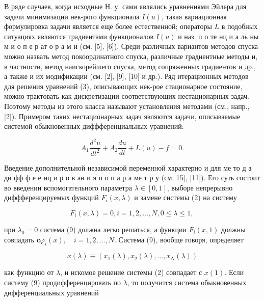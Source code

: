 \documentclass[10pt]{article}
\begin{document}
В ряде случаев, когда исходные Н. у. сами являлись уравнениями Эйлера для задачи минимизации нек-рого функционала $I(u)$, такая вариационная формулировка задачи является еще более естественной; операторы $L$ в подобных ситуациях являются градиентами функционалов $I(u)$ и наз. п о те нц и а ль ны м и о п е р ат о р а м и (см. [5], [6]). Среди различных вариантов методов спуска можно назвать метод покоординатного спуска, различные градиентные методы и, в частности, метод наискорейшего спуска, метод сопряженных градиентов и др., а также и их модификации (см. [2], [9], [10] и др.). Ряд итерационных методов для решения уравнений (3), описывающих нек-рое стационарное состояние, можно трактовать как дискретизации соответствующих нестационарных задач. Поэтому методы из этого класса называют установления методами (см., напр., [2]). Примером таких нестационарных задач являются задачи, описываемые системой обыкновенных диффференциальных уравнений:



\[

A_{1} \frac{d^{2} u}{d t^{2}}+A_{2} \frac{d u}{d t}+L(u)-f=0 .

\]



Введение дополнительной независимой переменной характерно и для ме то д а ди фф ф е е нц и р о в ан и я п о п а р а ме т р у (см. 15], [11]). Его суть состоит во введении вспомогательного параметра $\lambda \in[0,1]$, выборе непрерывно диффференцируемых функций $F_{i}(x, \lambda)$ и замене системы (2) на систему



\[

F_{i}(x, \lambda)=0, i=1,2, \ldots, N, 0 \leqslant \lambda \leqslant 1 \text {, }

\]



при $\lambda_{0}=0$ система (9) должна легко решаться, а функции $F_{i}(x, 1)$ должны совпадать $\mathbf{c} \varphi_{i}(x), \quad i=1,2, \ldots, N$. Система (9), вообще говоря, определяет



\[

x(\lambda) \equiv\left(x_{1}(\lambda), x_{2}(\lambda), \ldots, x_{N}(\lambda)\right)

\]



как функцию от $\lambda$, и искомое решение системы (2) совпадает с $x(1)$. Если систему (9) продифференцировать по $\lambda$, то получится система обыкновенных дифференциальных уравнений
\end{document}
